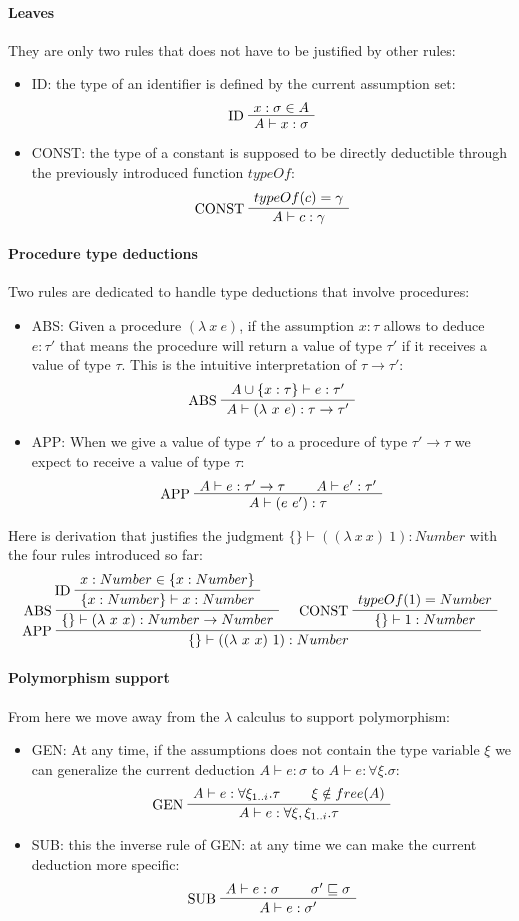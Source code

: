 \documentclass[a4paper]{report}
\newcommand{\ax}[1]%
{\AxiomC{$#1$}}
\newcommand{\unc}[1]%
{\UnaryInfC{$#1$}}
\newcommand{\bic}[1]%
{\BinaryInfC{$#1$}}
\newcommand{\drule}%
{\DisplayProof}
\begin{document}
\paragraph{Leaves} They are only two rules that does not have to be justified by other rules:
\begin{itemize}
\item ID: the type of an identifier is defined by the current assumption set:
$$\ax{x:\sigma\in A}
\LeftLabel{ID}
\unc{A\vdash x:\sigma}
\drule$$
\item CONST: the type of a constant is supposed to be directly deductible through the previously introduced function $typeOf$:
$$\ax{typeOf(c)=\gamma}
\LeftLabel{CONST}
\unc{A\vdash c:\gamma}
\drule$$
\end{itemize}

\paragraph{Procedure type deductions} Two rules are dedicated to handle type deductions that involve procedures:
\begin{itemize}
\item ABS: Given a procedure $(\lambda\ x\ e)$, if the assumption $x:\tau$ allows to deduce $e:\tau'$ that means the procedure will return a value of type $\tau'$ if it receives a value of type $\tau$. This is the intuitive interpretation of $\tau\to\tau'$:
$$\ax{A\cup\{x:\tau\}\vdash e:\tau'}
\LeftLabel{ABS}
\unc{A\vdash(\lambda\ x\ e):\tau\to\tau'}
\drule$$
\item APP: When we give a value of type $\tau'$ to a procedure of type $\tau'\to\tau$ we expect to receive a value of type $\tau$:
$$\ax{A\vdash e:\tau'\to\tau}
\ax{A\vdash e':\tau'}
\LeftLabel{APP}
\bic{A\vdash (e\ e'):\tau}
\drule$$
\end{itemize}
Here is derivation that justifies the judgment $\{\}\vdash((\lambda\ x\ x)\ 1):Number$ with the four rules introduced so far:
$$\ax{x:Number\in\{x:Number\}}
\LeftLabel{ID}
\unc{\{x:Number\}\vdash x:Number}
\LeftLabel{ABS}
\unc{\{\}\vdash(\lambda\ x\ x):Number\to Number}
\ax{typeOf(1)=Number}
\LeftLabel{CONST}
\unc{\{\}\vdash 1:Number}
\LeftLabel{APP}
\bic{\{\}\vdash ((\lambda\ x\ x)\ 1):Number}
\drule$$

\paragraph{Polymorphism support} From here we move away from the $\lambda$ calculus to support polymorphism:
\begin{itemize}
\item GEN: At any time, if the assumptions does not contain the type variable $\xi$ we can generalize the current deduction $A\vdash e:\sigma$ to $A\vdash e:\forall\xi.\sigma$:
$$\ax{A\vdash e:\forall\xi_{1..i}.\tau}
\ax{\xi\notin free(A)}
\LeftLabel{GEN}
\bic{A\vdash e:\forall\xi,\xi_{1..i}.\tau}
\drule$$
\item SUB: this the inverse rule of GEN: at any time we can make the current deduction more specific:
$$\ax{A\vdash e:\sigma}
\ax{\sigma'\sqsubseteq\sigma}
\LeftLabel{SUB}
\bic{A\vdash e:\sigma'}
\drule$$
\end{itemize}
\end{document}

